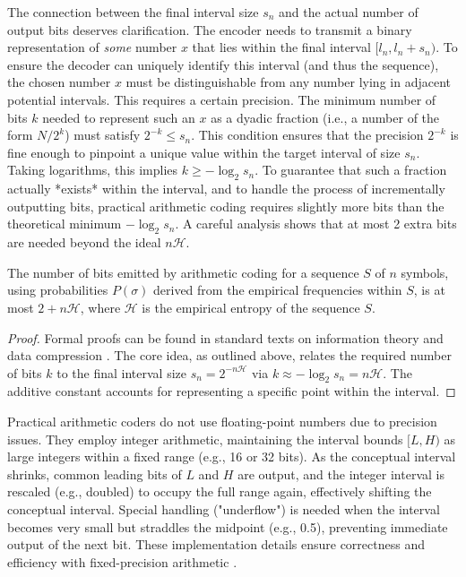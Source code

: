 The connection between the final interval size $s_n$ and the actual number of output bits deserves clarification. The encoder needs to transmit a binary representation of \emph{some} number $x$ that lies within the final interval $[l_n, l_n + s_n)$. To ensure the decoder can uniquely identify this interval (and thus the sequence), the chosen number $x$ must be distinguishable from any number lying in adjacent potential intervals. This requires a certain precision. The minimum number of bits $k$ needed to represent such an $x$ as a dyadic fraction (i.e., a number of the form $N/2^k$) must satisfy $2^{-k} \le s_n$. This condition ensures that the precision $2^{-k}$ is fine enough to pinpoint a unique value within the target interval of size $s_n$. Taking logarithms, this implies $k \ge -\log_2 s_n$. To guarantee that such a fraction actually *exists* within the interval, and to handle the process of incrementally outputting bits, practical arithmetic coding requires slightly more bits than the theoretical minimum $-\log_2 s_n$. A careful analysis shows that at most 2 extra bits are needed beyond the ideal $n\mathcal{H}$.

\begin{theorem} \label{thm:arithmetic_bits}
    The number of bits emitted by arithmetic coding for a sequence $S$ of $n$ symbols, using probabilities $P(\sigma)$ derived from the empirical frequencies within $S$, is at most $2 + n\mathcal{H}$, where $\mathcal{H}$ is the empirical entropy of the sequence $S$.
\end{theorem}
\begin{proof}
    Formal proofs can be found in standard texts on information theory and data compression \cite{ferragina2023pearls, sayood2002lossless, han2002mathematics, ElementsofInformationTheory}. The core idea, as outlined above, relates the required number of bits $k$ to the final interval size $s_n = 2^{-n\mathcal{H}}$ via $k \approx -\log_2 s_n = n\mathcal{H}$. The additive constant accounts for representing a specific point within the interval.
\end{proof}

\begin{remark}
    Practical arithmetic coders do not use floating-point numbers due to precision issues. They employ integer arithmetic, maintaining the interval bounds $[L, H)$ as large integers within a fixed range (e.g., 16 or 32 bits). As the conceptual interval shrinks, common leading bits of $L$ and $H$ are output, and the integer interval is rescaled (e.g., doubled) to occupy the full range again, effectively shifting the conceptual interval. Special handling ("underflow") is needed when the interval becomes very small but straddles the midpoint (e.g., 0.5), preventing immediate output of the next bit. These implementation details ensure correctness and efficiency with fixed-precision arithmetic \cite{moffat1998arithmetic}.
\end{remark}
